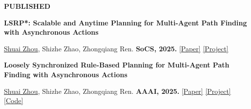 \documentclass[a4paper,9pt]{extarticle}
\begin{document}
{\textbf{\fontsize{12pt}{4pt}\selectfont P}\textbf{\scshape UBLISHED}}
\begin{enumerate}[label={[\arabic*]}, leftmargin=2em, resume]
\item \textbf{LSRP*: Scalable and Anytime Planning for Multi-Agent Path Finding with Asynchronous Actions}
\par\textup{\underline{Shuai Zhou}, Shizhe Zhao, Zhongqiang Ren. \textbf{SoCS, 2025.} \href{https://doi.org/10.1609/socs.v18i1.36016}{[Paper]}  \href{https://rap-lab.github.io/research/mapfaa}{[Project]}}   %
\item \textbf{Loosely Synchronized Rule-Based Planning for Multi-Agent Path Finding with Asynchronous Actions}
\par\textup{\underline{Shuai Zhou}, Shizhe Zhao, Zhongqiang Ren. \textbf{AAAI, 2025.} \href{https://doi.org/10.1609/aaai.v39i14.33618}{[Paper]} \href{https://rap-lab.github.io/research/mapfaa}{[Project]} \href{https://github.com/rap-lab-org/public_LSRP}{[Code]}}  %
\end{enumerate}
\end{document}

